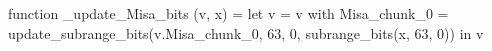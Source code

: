function _update_Misa_bits (v, x) = let v = { v with Misa_chunk_0 = update_subrange_bits(v.Misa_chunk_0, 63, 0, subrange_bits(x, 63, 0)) } in
  v
